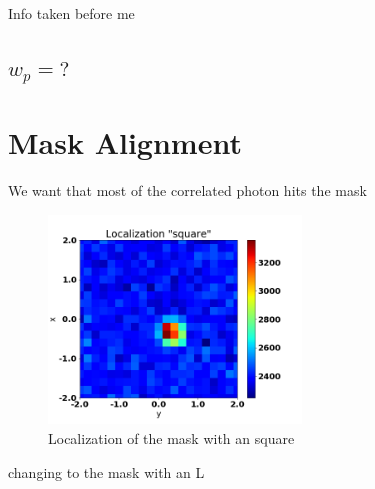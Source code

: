 Info taken before me 
\subsection{$w_p = ?$}

\section{Mask Alignment}
We want that most of the correlated photon hits the mask 

\begin{figure}[h!]
\centering
\includegraphics[width=0.6\textwidth]{Figures/localizationSq.png} 
\caption{Localization of the mask with an square}
\label{fig:localizationSq}
\end{figure}

changing to the mask with an L

